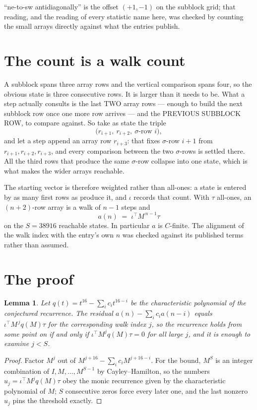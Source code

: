 \documentclass[11pt,a4paper]{article}
\theoremstyle{plain}
\newtheorem{lemma}[theorem]{Lemma}
\theoremstyle{definition}
\begin{document}
``ne-to-sw antidiagonally'' is the offset $(+1,-1)$ on the subblock grid; that reading, and
the reading of every statistic name here, was checked by counting the small arrays directly
against what the entries publish.

\section{The count is a walk count}

A subblock spans three array rows and the vertical comparison spans four, so the obvious state
is three consecutive rows. It is larger than it needs to be. What a step actually consults is
the last TWO array rows --- enough to build the next subblock row once one more row arrives ---
and the PREVIOUS SUBBLOCK ROW, to compare against. So take as state the triple
\[
\bigl(r_{i+1},\ r_{i+2},\ \sigma\text{-row }i\bigr),
\]
and let a step append an array row $r_{i+3}$: that fixes $\sigma$-row $i+1$ from
$r_{i+1},r_{i+2},r_{i+3}$, and every comparison between the two $\sigma$-rows is settled
there. All the third rows that produce the same $\sigma$-row collapse into one state, which is
what makes the wider arrays reachable.

The starting vector is therefore weighted rather than all-ones: a state is entered by as many
first rows as produce it, and $\iota$ records that count. With $\tau$ all-ones, an
$(n+2)$-row array is a walk of $n-1$ steps and
\[
a(n)\;=\;\iota^{\!\top}M^{\,n-1}\tau
\]
on the $S=38916$ reachable states. In particular $a$ is $C$-finite. The alignment of the walk
index with the entry's own $n$ was checked against its published terms rather than assumed.

\section{The proof}

\begin{lemma}\label{lem:crit}
Let $q(t)=t^{16}-\sum_i c_it^{16-i}$ be the characteristic polynomial of the
conjectured recurrence. The residual $a(n)-\sum_ic_ia(n-i)$ equals
$\iota^{\!\top}M^{\,j}q(M)\tau$ for the corresponding walk index $j$, so the recurrence
holds from some point on if and only if $\iota^{\!\top}M^{j}q(M)\tau=0$ for all large $j$,
and it is enough to examine $j<S$.
\end{lemma}

\begin{proof}
Factor $M^{j}$ out of $M^{j+16}-\sum_ic_iM^{j+16-i}$. For the bound, $M^{S}$
is an integer combination of $I,M,\dots,M^{S-1}$ by Cayley--Hamilton, so the numbers
$u_j=\iota^{\!\top}M^{j}q(M)\tau$ obey the monic recurrence given by the characteristic
polynomial of $M$; $S$ consecutive zeros force every later one, and the last nonzero $u_j$
pins the threshold exactly.
\end{proof}
\end{document}
